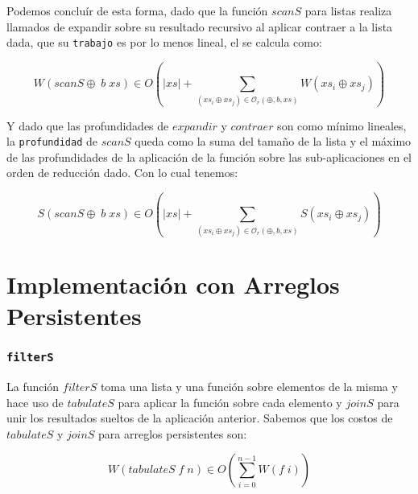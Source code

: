 \documentclass[a4paper,10pt]{article}
\begin{document}
\bigskip

    Podemos concluír de esta forma, dado que la función $scanS$ para listas realiza
llamados de expandir sobre su resultado recursivo al aplicar contraer a la lista
dada, que su \texttt{trabajo} es por lo menos lineal, el se calcula como:

\begin{equation*}
    W \left( scanS \oplus \; b \; xs \right) \in
    O \left( \vert xs \vert + \sum_{(xs_i \oplus xs_j) \in \mathcal{O}_r(\oplus,b,xs)} W \left( xs_i \oplus xs_j \right) \right)
\end{equation*}

    Y dado que las profundidades de $expandir$ y $contraer$ son como mínimo lineales,
la \texttt{profundidad} de $scanS$ queda como la suma del tamaño de la lista y el
máximo de las profundidades de la aplicación de la función sobre las sub-aplicaciones
en el orden de reducción dado. Con lo cual tenemos:

\begin{equation*}
    S \left( scanS \oplus \; b \; xs \right) \in
    O \left( \vert xs \vert + \sum_{(xs_i \oplus xs_j) \in \mathcal{O}_r(\oplus,b,xs)} S \left( xs_i \oplus xs_j \right) \right)
\end{equation*}





\bigskip
\newpage{}





\part*{Implementación con Arreglos Persistentes}

\section*{\texttt{filterS}}

    La función $filterS$ toma una lista y una función sobre elementos de la misma
y hace uso de $tabulateS$ para aplicar la función sobre cada elemento y $joinS$ para
unir los resultados sueltos de la aplicación anterior.
    Sabemos que los costos de $tabulateS$ y $joinS$ para arreglos persistentes son:

\begin{equation*}
    W \left(tabulateS \;f \;n \right) \in
    O \left( \sum_{i=0}^{n-1} W \left( f\; i \right) \right)
\end{equation*}
\end{document}
